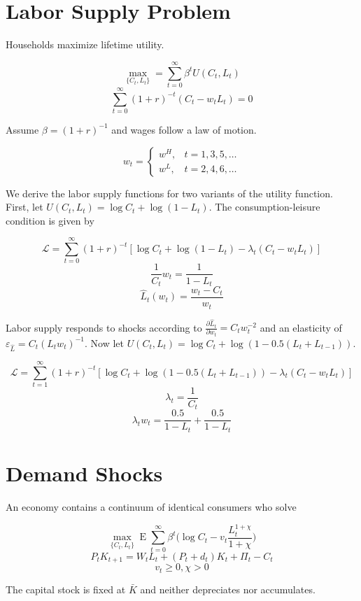 \documentclass[11pt]{article}
\DeclareMathOperator{\ev}{E}
\begin{document}
\section{Labor Supply Problem}

    Households maximize lifetime utility.

        $$ \max_{\{C_t, L_t\}} = \sum_{t=0}^\infty \beta^t U(C_t, L_t) $$
        $$ \sum_{t=0}^\infty (1+r)^{-t} (C_t - w_t L_t) = 0 $$

    Assume $\beta = (1+r)^{-1}$ and wages follow a law of motion.

        $$ w_t = \begin{cases}
        w^H, & t = 1, 3, 5, \dots \\
        w^L, & t = 2, 4, 6, \dots
        \end{cases} $$

    We derive the labor supply functions for two variants of the utility function. First, let $U(C_t, L_t) = \log C_t + \log(1-L_t)$. The consumption-leisure condition is given by

        $$ \mathcal L = \sum_{t=0}^\infty (1+r)^{-t} [\log C_t + \log(1-L_t) - \lambda_t (C_t - w_t L_t)] $$
        $$ \frac{1}{C_t} w_t =  \frac{1}{1-L_t} $$
        $$ \hat L_t(w_t) = \frac{w_t - C_t}{w_t} $$

    Labor supply responds to shocks according to $\frac{\partial \hat L_t}{\partial w_t} = C_t w_t^{-2}$ and an elasticity of $\varepsilon_{\hat L} = C_t (L_t w_t)^{-1}$. Now let $U(C_t, L_t) = \log C_t + \log(1- 0.5 (L_t + L_{t-1}))$.

        $$ \mathcal L = \sum_{t=1}^\infty (1+r)^{-t} [\log C_t + \log(1- 0.5 (L_t + L_{t-1})) - \lambda_t (C_t - w_t L_t)] $$
        $$ \lambda_t = \frac{1}{C_t} $$
        $$ \lambda_t w_t = \frac{0.5}{1-L_t} + \frac{0.5}{1-L_t} $$

\section{Demand Shocks}

    An economy contains a continuum of identical consumers who solve

        $$ \max_{\{C_t, L_t\}} \ev \sum_{t=0}^\infty \beta^t \bigg ( \log C_t - v_t \frac{L_t^{1+\chi}}{1+\chi} \bigg ) $$
        $$ P_t K_{t+1} = W_t L_t + (P_t + d_t) K_t + \Pi_t - C_t $$
        $$ v_t \geq 0, \chi > 0 $$

    The capital stock is fixed at $\bar K$ and neither depreciates nor accumulates.
\end{document}
